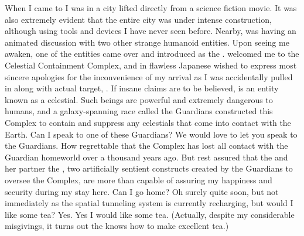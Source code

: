 \documentclass[char]{guardians}
\begin{document}
When I came to I was in a city lifted directly from a science fiction movie. It was also extremely evident that the entire city was under intense construction, although using tools and devices I have never seen before. Nearby, \cUnity{} was having an animated discussion with two other strange humanoid entities. Upon seeing me awaken, one of the entities came over and introduced \cCaretaker{\themself} as the \cCaretaker{}. \cCaretaker{\They} welcomed me to the Celestial Containment Complex, and in flawless Japanese wished to express \cCaretaker{\their} most sincere apologies for the inconvenience of my arrival as I was accidentally pulled in along with \cCaretaker{\their} actual target, \cUnity{}. If \cCaretaker{\their} insane claims are to be believed, \cUnity{} is an entity known as a celestial. Such beings are powerful and extremely dangerous to humans, and a galaxy-spanning race called the Guardians constructed this Complex to contain and suppress any celestials that come into contact with the Earth. Can I speak to one of these Guardians? We would love to let you speak to the Guardians. How regrettable that the Complex has lost all contact with the Guardian homeworld over a thousand years ago. But rest assured that the \cCaretaker{} and her partner the \cWarden{}, two artificially sentient constructs created by the Guardians to oversee the Complex, are more than capable of assuring my happiness and security during my stay here. Can I go home? Oh surely quite soon, but not immediately as the spatial tunneling system is currently recharging, but would I like some tea? Yes. Yes I would like some tea. (Actually, despite my considerable misgivings, it turns out the \cCaretaker{} knows how to make excellent tea.)
\end{document}
